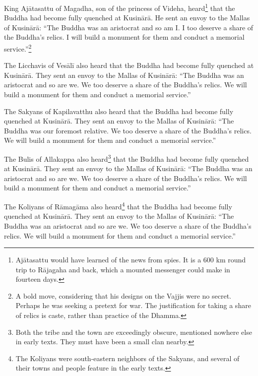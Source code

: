 \documentclass[12pt,openany]{book}%
\begin{document}
King \textsanskrit{Ajātasattu} of Magadha, son of the princess of Videha, heard\footnote{\textsanskrit{Ajātasattu} would have learned of the news from spies. It is a 600 km round trip to \textsanskrit{Rājagaha} and back, which a mounted messenger could make in fourteen days. } that the Buddha had become fully quenched at \textsanskrit{Kusinārā}. He sent an envoy to the Mallas of \textsanskrit{Kusinārā}: “The Buddha was an aristocrat and so am I. I too deserve a share of the Buddha’s relics. I will build a monument for them and conduct a memorial service.”\footnote{A bold move, considering that his designs on the Vajjis were no secret. Perhaps he was seeking a pretext for war. The justification for taking a share of relics is caste, rather than practice of the Dhamma. } 

The Licchavis of \textsanskrit{Vesālī} also heard that the Buddha had become fully quenched at \textsanskrit{Kusinārā}. They sent an envoy to the Mallas of \textsanskrit{Kusinārā}: “The Buddha was an aristocrat and so are we. We too deserve a share of the Buddha’s relics. We will build a monument for them and conduct a memorial service.” 

The Sakyans of Kapilavatthu also heard that the Buddha had become fully quenched at \textsanskrit{Kusinārā}. They sent an envoy to the Mallas of \textsanskrit{Kusinārā}: “The Buddha was our foremost relative. We too deserve a share of the Buddha’s relics. We will build a monument for them and conduct a memorial service.” 

The Bulis of Allakappa also heard\footnote{Both the tribe and the town are exceedingly obscure, mentioned nowhere else in early texts. They must have been a small clan nearby. } that the Buddha had become fully quenched at \textsanskrit{Kusinārā}. They sent an envoy to the Mallas of \textsanskrit{Kusinārā}: “The Buddha was an aristocrat and so are we. We too deserve a share of the Buddha’s relics. We will build a monument for them and conduct a memorial service.” 

The Koliyans of \textsanskrit{Rāmagāma} also heard\footnote{The Koliyans were south-eastern neighbors of the Sakyans, and several of their towns and people feature in the early texts. } that the Buddha had become fully quenched at \textsanskrit{Kusinārā}. They sent an envoy to the Mallas of \textsanskrit{Kusinārā}: “The Buddha was an aristocrat and so are we. We too deserve a share of the Buddha’s relics. We will build a monument for them and conduct a memorial service.” 
\end{document}

